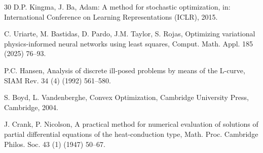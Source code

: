 \documentclass[a4paper,fleqn]{cas-sc}
\begin{document}
\begin{thebibliography}{30}
D.P. Kingma, J. Ba, Adam: A method for stochastic optimization, in: International Conference on Learning
Representations (ICLR), 2015.

C. Uriarte, M. Bastidas, D. Pardo, J.M. Taylor, S. Rojas, Optimizing variational physics-informed neural networks using
least squares, Comput. Math. Appl. 185 (2025) 76--93.

P.C. Hansen, Analysis of discrete ill-posed problems by means of the L-curve, SIAM Rev. 34 (4) (1992) 561--580.

S. Boyd, L. Vandenberghe, Convex Optimization, Cambridge University Press, Cambridge, 2004.

J. Crank, P. Nicolson, A practical method for numerical evaluation of solutions of partial differential equations of
the heat-conduction type, Math. Proc. Cambridge Philos. Soc. 43 (1) (1947) 50--67.

\end{thebibliography}


\clearpage\addtocounter{page}{-1}
\end{document}
